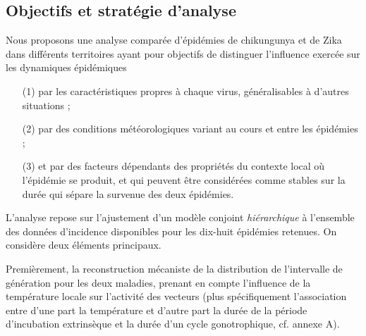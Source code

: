 \subsection{Objectifs et stratégie d'analyse}
\label{sec:presenttsir}

Nous proposons une analyse comparée d'épidémies de chikungunya et de Zika dans différents territoires ayant pour objectifs de distinguer l'influence exercée sur les dynamiques épidémiques
\begin{enumerate}
\item[(1)] par les caractéristiques propres à chaque virus, généralisables à d'autres situations ;
\item[(2)] par des conditions météorologiques variant au cours et entre les épidémies ;
\item[(3)] et par des facteurs dépendants des propriétés du contexte local où l'épidémie se produit, et qui peuvent être considérées comme stables sur la durée qui sépare la survenue des deux épidémies.
\end{enumerate}
L'analyse repose sur l'ajustement d'un modèle conjoint {\em hiérarchique} à l'ensemble des données d'incidence disponibles pour les dix-huit épidémies retenues.
On considère deux éléments principaux.

Premièrement, la reconstruction mécaniste de la distribution de l'intervalle de génération pour les deux maladies, prenant en compte l'influence de la température locale sur l'activité des vecteurs (plus spécifiquement l'association entre d'une part la température et d'autre part la durée de la période d'incubation extrinsèque et la durée d'un cycle gonotrophique, cf. annexe A).

